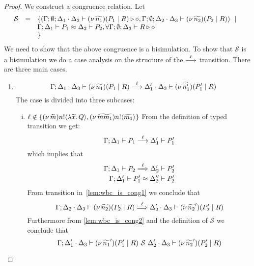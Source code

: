\begin{proof}
	\noi We construct a congruence relation. Let
	\[
	\begin{array}{rcl}
		\mathcal{S} &=&	\{
				(\Gamma; \emptyset; \Delta_1 \cdot \Delta_3 \vdash (\nu\, \widetilde{n_1})(P_1 \;|\; R) \triangleright \diamond,
				\Gamma; \emptyset; \Delta_2 \cdot \Delta_3 \vdash (\nu\, \widetilde{n_2})(P_2 \;|\; R))
				\ \ |\ \  \\
		& &		\Gamma; \Delta_1 \vdash P_1 \approx \Delta_2 \vdash P_2, \forall \Gamma; \emptyset; \Delta_3 \vdash R \triangleright \diamond\\
		& &\}
	\end{array}
	\]
	\noi We need to show that the above congruence is a bisimulation.
	To show that $\mathcal{S}$ is a bisimulation we do a case analysis on the structure
	of the $\stackrel{\ell}{\longrightarrow}$ transition. There are three main cases.


	\begin{enumerate}

		\item 
				\[
					\Gamma; \Delta_1 \cdot \Delta_3 \vdash (\nu\, \widetilde{n_1})(P_1 \;|\; R) \stackrel{\ell}{\longrightarrow} \Delta_1' \cdot \Delta_3 \vdash (\nu\, \widetilde{n_1'})(P_1' \;|\; R)
				\]
				\noi The case is divided into three subcases:

				\begin{enumerate}[i.]
					\item	$\ell \notin \{(\nu\, \widetilde{m}) n ! \langle \lambda \widetilde{x}.\,Q \rangle, (\nu\, \widetilde{mm_1}) n ! \langle \widetilde{m_1} \rangle\}$
							\noi From the definition of typed transition we get:
							\[
								\Gamma; \Delta_1 \vdash P_1 \stackrel{\ell}{\longrightarrow} \Delta_1' \vdash P_1'
							\]
							\noi which implies that
							\begin{eqnarray}
								\Gamma; \Delta_1 \vdash P_2 \stackrel{\ell}{\Longrightarrow} \Delta_2' \vdash P_2'
								\label{lem:wbc_is_cong1}\\
								\Gamma; \Delta_1' \vdash P_1' \approx \Delta_2'' \vdash P_2'
								\label{lem:wbc_is_cong2}
							\end{eqnarray}
							\noi From transition in~\eqref{lem:wbc_is_cong1} we conclude that 
							\[
								\Gamma; \Delta_2 \cdot \Delta_3 \vdash (\nu\, \widetilde{n_2})(P_2 \;|\; R) \stackrel{\ell}{\Longrightarrow} \Delta_2' \cdot \Delta_3 \vdash (\nu\, \widetilde{n_2}')(P_2' \;|\; R)
							\]
							\noi Furthermore from \eqref{lem:wbc_is_cong2} and the definition of $\mathcal{S}$ we conclude that
							\[
								\Gamma; \Delta_1' \cdot \Delta_3 \vdash (\nu\, \widetilde{n_1}')(P_1' \;|\; R) \ \mathcal{S}\  \Delta_2' \cdot \Delta_3 \vdash (\nu\, \widetilde{n_2}')(P_2' \;|\; R)
							\]


\end{enumerate}
\end{enumerate}
\end{proof}
